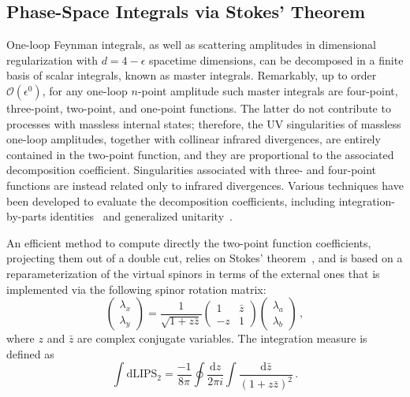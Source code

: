 \subsection{Phase-Space Integrals via Stokes' Theorem}
\label{sec:ALPphasespace_stokes}

One-loop Feynman integrals, as well as scattering amplitudes in dimensional regularization
with $d= 4- \epsilon$ spacetime dimensions, can be decomposed in a finite basis of scalar
integrals, known as master integrals.
Remarkably, up to order $\mathcal{O}(\epsilon^0)$, for any one-loop $n$-point amplitude such
master integrals are four-point, three-point, two-point, and one-point functions.
The latter do not contribute to processes with massless internal states; therefore, the
UV singularities of massless one-loop amplitudes, together with collinear infrared
divergences, are entirely contained in the two-point function, and they are proportional to
the associated decomposition coefficient.
Singularities associated with three- and four-point functions are instead related only to
infrared divergences.
Various techniques have been developed to evaluate the decomposition coefficients, including
integration-by-parts identities~\cite{Tkachov:1981wb,Chetyrkin:1981qh,Laporta:2000dsw} and
generalized unitarity~\cite{Bern:1994zx,Bern:1995db,Britto:2004nc,Britto:2006sj,Anastasiou:2006gt,Ossola:2006us}.

An efficient method to compute directly the two-point function coefficients, projecting them
out of a double cut, relies on Stokes' theorem~\cite{Mastrolia:2009dr}, and is based on a
reparameterization of the virtual spinors in terms of the external ones that is implemented
via the following spinor rotation matrix:
\begin{equation}
    \begin{pmatrix}
 \lambda_x \\
 \lambda_y
    \end{pmatrix}
     =
   \frac{1}{\sqrt{1+ z \bar{z}}}
   \begin{pmatrix}
 1 & \bar{z} \\
 -z & 1
\end{pmatrix}
\begin{pmatrix}
 \lambda_{a} \\
 \lambda_{b}
    \end{pmatrix}\,,
    \label{eq:ALPstokes_par}
\end{equation}
where $z$ and $\bar{z}$ are complex conjugate variables.
The integration measure is defined as
\begin{equation}
    \int \text{dLIPS}_2 =
    \frac{-1}{8 \pi}
    \oint \frac{\text{d}z}{2\pi i }
    \int
    \frac{\text{d}{\bar z}}{(1 + z \bar{z})^2} \, .
    \label{eq:ALPstokes_measure}
\end{equation}

